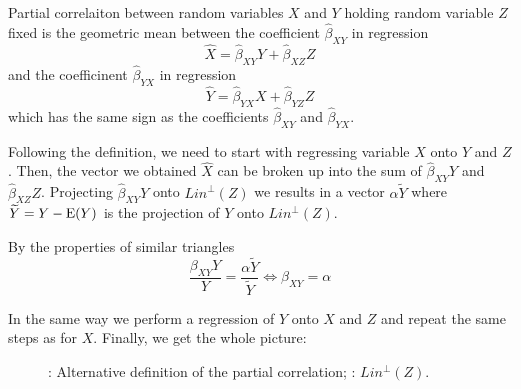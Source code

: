\begin{definition}
Partial correlaiton between random variables $X$ and $Y$ holding random variable $Z$
fixed is the geometric mean between the coefficient $\hat \beta_{XY}$ in regression
\[
\hat X = \hat \beta_{XY} Y + \hat \beta_{XZ} Z
\]
and the coefficinent $\hat \beta_{YX}$ in regression
\[
\hat Y = \hat \beta_{YX} X + \hat \beta_{YZ} Z
\]
which has the same sign as the coefficients $\hat \beta_{XY}$ and $\hat \beta_{YX}$.
\end{definition}

Following the definition, we need to start with regressing variable $X$ onto
$Y$ and $Z$. Then, the vector we obtained $\hat X$ can be broken up into the sum of
$\hat \beta_{XY} Y$ and $\hat \beta_{XZ} Z$.
Projecting $\hat \beta_{XY} Y$ onto $Lin^{\perp}(Z)$ we results in a vector
$\alpha \widetilde Y$ where $\widetilde Y = Y - \operatorname{E}(Y)$ is the projection of $Y$ onto $Lin^{\perp}(Z)$.

By the properties of similar triangles
\[
\frac{\beta_{XY} Y}{Y} = \frac{\alpha \widetilde Y}{\widetilde Y} \Leftrightarrow \beta_{XY} = \alpha
\]

In the same way we perform a regression of $Y$ onto $X$ and $Z$ and repeat the
same steps as for $X$. Finally, we get the whole picture:

\begin{figure}[ht!]
\begin{center}
\caption{: Alternative definition of the partial correlation;
: $Lin^{\perp}(Z)$.}
\end{center}
\end{figure}

